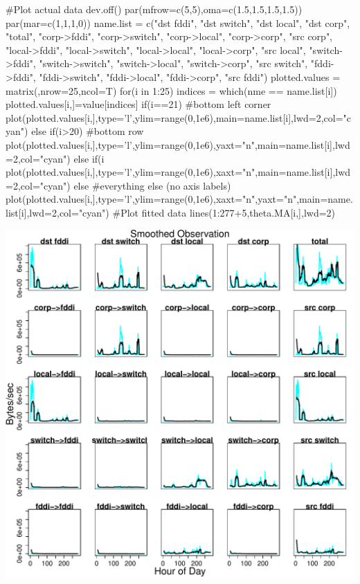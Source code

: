 \documentclass[letterpaper,10pt]{amsart}
\newenvironment{verbatimcode}{\bigskip \scriptsize \verbatim}{\endverbatim \normalsize \bigskip}
\begin{document}
\begin{enumerate}[{1}.1]
\begin{verbatimcode}
#Plot actual data
dev.off()
par(mfrow=c(5,5),oma=c(1.5,1.5,1.5,1.5))
par(mar=c(1,1,1,0))
name.list = c("dst fddi", "dst switch", "dst local", "dst corp", "total", 
              "corp->fddi", "corp->switch", "corp->local", "corp->corp", "src corp",
              "local->fddi", "local->switch", "local->local", "local->corp", "src local",
              "switch->fddi", "switch->switch", "switch->local", "switch->corp", "src switch",
              "fddi->fddi", "fddi->switch", "fddi->local", "fddi->corp", "src fddi")
plotted.values = matrix(,nrow=25,ncol=T)
for(i in 1:25)
{
  indices = which(nme == name.list[i])
  plotted.values[i,]=value[indices]
  if(i==21) #bottom left corner
  {
    plot(plotted.values[i,],type='l',ylim=range(0,1e6),main=name.list[i],lwd=2,col="cyan")
  }else if(i>20) #bottom row
  {
    plot(plotted.values[i,],type='l',ylim=range(0,1e6),yaxt="n",main=name.list[i],lwd=2,col="cyan")
  }else if(i%
  {
    plot(plotted.values[i,],type='l',ylim=range(0,1e6),xaxt="n",main=name.list[i],lwd=2,col="cyan")
  }else #everything else (no axis labels)
  {
    plot(plotted.values[i,],type='l',ylim=range(0,1e6),xaxt="n",yaxt="n",main=name.list[i],lwd=2,col="cyan")
  }
  #Plot fitted data
  lines(1:277+5,theta.MA[i,],lwd=2)
}
\end{verbatimcode}

\begin{center}
\includegraphics[scale=0.75]{tam_gregory_fig5.pdf}
\end{center}



\end{enumerate}
\end{document}
